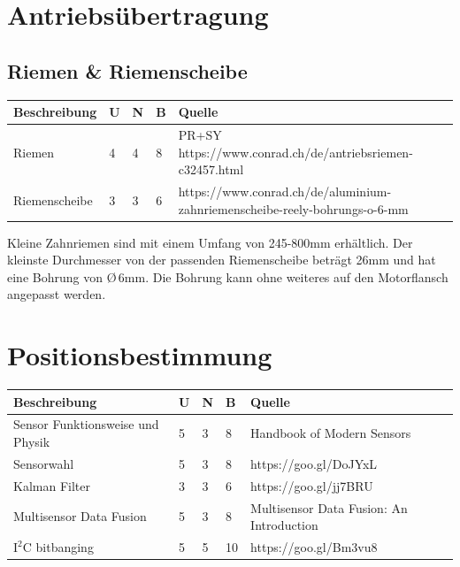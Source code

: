 \documentclass[a4paper]{report}
\begin{document}
\section{Antriebsübertragung}
	\subsection{Riemen \& Riemenscheibe}
		\begin{tabular}{|p{}|p{}|p{}|p{}|p{}|}
		\hline
		\textbf{Beschreibung} & \textbf{U} & \textbf{N} & \textbf{B} & \textbf{Quelle} \\
		\hline
		Riemen &4 &4 &8 & PR+SY
		\newline https://www.conrad.ch/de/antriebsriemen-c32457.html \\
		\hline
		Riemenscheibe &3 &3 &6 &https://www.conrad.ch/de/aluminium-zahnriemenscheibe-reely-bohrungs-o-6-mm \\
		\hline
	\end{tabular}


		Kleine Zahnriemen sind mit einem Umfang von 245-800mm erhältlich. Der kleinste Durchmesser von der passenden Riemenscheibe beträgt 26mm und hat eine Bohrung von \O \,6mm. Die Bohrung kann ohne weiteres auf den Motorflansch angepasst werden.

\section{Positionsbestimmung}

\vspace{1em}
\noindent
\begin{tabular}{|p{}|p{}|p{}|p{}|p{}|}
	\hline
	\textbf{Beschreibung} & \textbf{U} & \textbf{N} & \textbf{B} & \textbf{Quelle} \\
	\hline
	Sensor Funktionsweise und Physik & 5 & 3 & 8 & Handbook of Modern Sensors \\
	\hline
	Sensorwahl & 5 & 3 & 8 & https://goo.gl/DoJYxL \\
	\hline
	Kalman Filter & 3 & 3 & 6 & https://goo.gl/jj7BRU \\
	\hline
	Multisensor Data Fusion & 5 & 3 & 8 & Multisensor Data Fusion: An Introduction \\
	\hline
	$\text{I}^2\text{C}$ bitbanging & 5 & 5 & 10 & https://goo.gl/Bm3vu8 \\
	\hline
\end{tabular}
\end{document}
